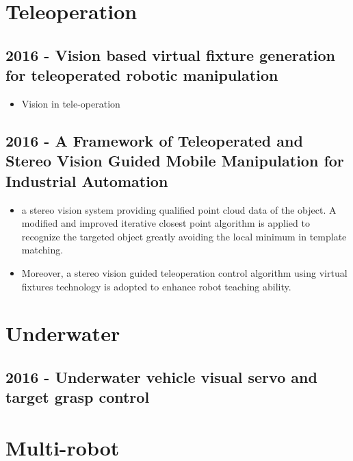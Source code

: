 \vspace{3cm}

\section{Teleoperation}
\subsection{2016 - Vision based virtual fixture generation for teleoperated robotic manipulation}
\begin{itemize}
\item Vision in tele-operation 
\end{itemize}

\subsection{2016 - A Framework of Teleoperated and Stereo Vision Guided Mobile Manipulation for Industrial Automation}
\begin{itemize}
\item  a stereo vision system providing qualified point cloud data of the object. A modified and improved iterative closest point algorithm is applied to recognize the targeted object greatly avoiding the local minimum in template matching.
\item Moreover, a stereo vision guided teleoperation control algorithm using virtual fixtures technology is adopted to enhance robot teaching ability.
\end{itemize}

\vspace{3cm}

\section{Underwater}
\subsection{2016 - Underwater vehicle visual servo and target grasp control}

\vspace{3cm}

\section{Multi-robot}
